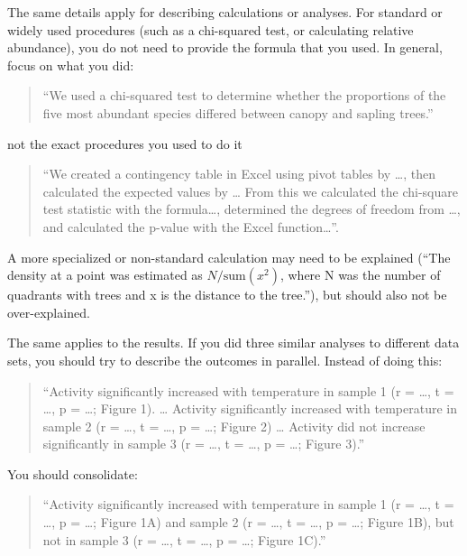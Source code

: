 \documentclass[]{book}
\begin{document}
The same details apply for describing calculations or analyses. For
standard or widely used procedures (such as a chi-squared test, or
calculating relative abundance), you do not need to provide the formula
that you used. In general, focus on what you did:

\begin{quote}
``We used a chi-squared test to determine whether the proportions of the
five most abundant species differed between canopy and sapling trees.''
\end{quote}

not the exact procedures you used to do it

\begin{quote}
``We created a contingency table in Excel using pivot tables by
\ldots{}, then calculated the expected values by \ldots{} From this we
calculated the chi-square test statistic with the formula\ldots{},
determined the degrees of freedom from \ldots{}, and calculated the
p-value with the Excel function\ldots{}''.
\end{quote}

A more specialized or non-standard calculation may need to be explained
(``The density at a point was estimated as \(N / \text{sum}(x^2)\),
where N was the number of quadrants with trees and x is the distance to
the tree.''), but should also not be over-explained.

The same applies to the results. If you did three similar analyses to
different data sets, you should try to describe the outcomes in
parallel. Instead of doing this:

\begin{quote}
``Activity significantly increased with temperature in sample 1 (r =
\ldots{}, t = \ldots{}, p = \ldots{}; Figure 1). \ldots{} Activity
significantly increased with temperature in sample 2 (r = \ldots{}, t =
\ldots{}, p = \ldots{}; Figure 2) \ldots{} Activity did not increase
significantly in sample 3 (r = \ldots{}, t = \ldots{}, p = \ldots{};
Figure 3).''
\end{quote}

You should consolidate:

\begin{quote}
``Activity significantly increased with temperature in sample 1 (r =
\ldots{}, t = \ldots{}, p = \ldots{}; Figure 1A) and sample 2 (r =
\ldots{}, t = \ldots{}, p = \ldots{}; Figure 1B), but not in sample 3 (r
= \ldots{}, t = \ldots{}, p = \ldots{}; Figure 1C).''
\end{quote}
\end{document}
